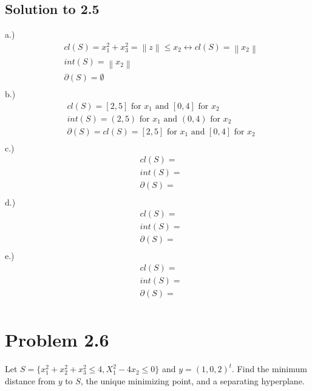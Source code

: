 \documentclass[12pt]{article}
\begin{document}
\subsection{Solution to 2.5}
\quad \quad \quad  \quad a.)\\
        \begin{align*}
            &cl(S) = x_1^2 + x_3^2 = \left\| z \right\| \leq x_2 \leftrightarrow cl(S) = \left\| x_2 \right\| \\
            &int(S) = \left\| x_2 \right\|\\
            &\partial(S) = \emptyset \\    
        \end{align*}
\quad \quad \quad  \quad b.)\\
        \begin{align*}
            &cl(S) = [2,5] \text{ for } x_1 \text{ and } [0,4] \text{ for } x_2\\
            &int(S) = (2,5) \text{ for } x_1 \text{ and } (0,4) \text{ for } x_2\\
            &\partial(S) = cl(S) =[2,5] \text{ for } x_1 \text{ and } [0,4] \text{ for } x_2\\   
        \end{align*}
\quad \quad \quad  \quad c.)\\
        \begin{align*}
            &cl(S) = \\
            &int(S) = \\
            &\partial(S) = \\    
        \end{align*}
\quad \quad \quad  \quad d.)\\
        \begin{align*}
            &cl(S) = \\
            &int(S) = \\
            &\partial(S) = \\    
        \end{align*}   
\quad \quad \quad  \quad e.)\\
        \begin{align*}
            &cl(S) = \\
            &int(S) = \\
            &\partial(S) = \\    
        \end{align*}
        
\section{Problem 2.6}
Let $S = \{ x_1^2 + x_2^2 + x_3^2 \leq 4 , X_1^2 - 4x_2 \leq 0 \}$ and $y = (1, 0 , 2)^t$. Find the minimum distance from $y$ to $S$, the unique minimizing point, and a separating hyperplane.\\
\end{document}
